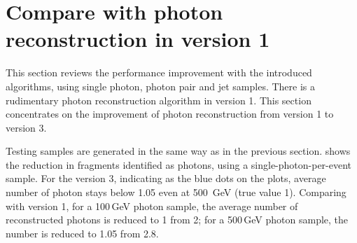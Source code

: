 \section{Compare with photon reconstruction in \pandora version 1}
\label{sec:photonPerformanceCompare}

This section reviews the performance improvement with the introduced algorithms, using single photon, photon pair and jet samples. There is a rudimentary photon reconstruction algorithm in \pandora version 1. This section concentrates on the improvement of photon reconstruction from \pandora version 1 to version 3.




Testing samples are generated in the same way as in the previous section.  shows the reduction in fragments identified as photons, using a single-photon-per-event sample. For the \pandora version 3, indicating as the blue dots on the plots, average number of photon stays below 1.05 even at 500 \,GeV (true value 1). Comparing with \pandora version 1, for a 100\,GeV photon sample, the average number of reconstructed photons is reduced to 1 from 2; for a 500\,GeV photon sample, the  number is reduced to 1.05 from 2.8.


